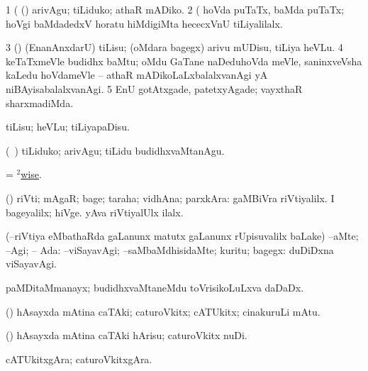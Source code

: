 \noindent 
\gl{\pagu}
\bmng
\bnum
\num{1}  (   (\AmA) arivAgu; tiLiduko; athaR mADiko. 
\num{2}  (      hoVda puTaTx, baMda puTaTx; hoVgi baMdadedxV horatu hiMdigiMta hececxVnU tiLiyalilalx. 
\num{3}  (\AmA) (EnanAnxdarU) tiLisu; (oMdara bagegx) arivu mUDisu, tiLiya heVLu. 
\num{4}  keTaTxmeVle budidhx baMtu; oMdu GaTane naDeduhoVda meVle, saninxveVsha kaLedu hoVdameVle -- athaR mADikoLaLxbalalxvanAgi yA niBAyisabalalxvanAgi. 
\num{5}  EnU gotAtxgade, patetxyAgade; vayxthaR sharxmadiMda. 
\enum
\emng
\eentry

\bentry
{} 
\gl{\sakirx}
\bmng
tiLisu; heVLu; tiLiyapaDisu. 
\emng

\noindent
\gl{\akirx}
\bmng
(\kanmu\ \ame) tiLiduko; arivAgu; tiLidu budidhxvaMtanAgu. 
\emng

\noindent 
\gl{\pagu}
\bmng
{} = \hyperlink{wise(2)}{$^2$wise}. 
\emng
\eentry

\bentry
{} 
\gl{\nA}
\expl{}
\bmng
(\pArxparx) riVti; mAgaR; bage; taraha; vidhAna; parxkAra:  gaMBiVra riVtiyalilx.  I bageyalilx; hiVge.  yAva riVtiyalUlx ilalx. 
\emng
\eentry

\bentry
{}
\gl{\uparx}
\expl{}
\bmng
(--riVtiya eMbathaRda \gu gaLanunx matutx \kirxvi gaLanunx rUpisuvalilx baLake) 
\banum
{} --aMte; --Agi; -- Ada:  
 --viSayavAgi; --saMbaMdhisidaMte; kuritu; bagegx:  duDiDxna viSayavAgi. 
\eanum
\emng
\eentry

\bentry
{}
\gl{\nA}
\bmng
paMDitaMmanayx; budidhxvaMtaneMdu toVrisikoLuLxva daDaDx. 
\emng
\eentry

\bentry
{}
\gl{\nA}
\bmng
(\AmA) hAsayxda mAtina caTAki; caturoVkitx; cATUkitx; cinakuruLi mAtu. 
\emng
\eentry

\bentry
{}
\gl{\akirx}
\bmng
(\AmA) hAsayxda mAtina caTAki hArisu; caturoVkitx nuDi. 
\emng
\eentry

\bentry
{}
\gl{\nA}
\bmng
cATUkitxgAra; caturoVkitxgAra. 
\emng
\eentry


